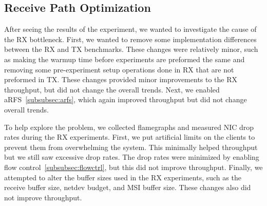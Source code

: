 \subsection{Receive Path Optimization}
\label{subsec:rx_opt}

After seeing the results of the experiment, we wanted to investigate the cause of the RX bottleneck. First, we wanted to remove some implementation differences between the RX and TX benchmarks. These changes were relatively minor, such as making the warmup time before experiments are preformed the same and removing some pre-experiment setup operations done in RX that are not preformed in TX. These changes provided minor improvements to the RX throughput, but did not change the overall trends. Next, we enabled aRFS~\ref{subsubsec:arfs}, which again improved throughput but did not change overall trends.

To help explore the problem, we collected flamegraphs and measured NIC drop rates during the RX experiments. First, we put artificial limits on the clients to prevent them from overwhelming the system. This minimally helped throughput but we still saw excessive drop rates. The drop rates were minimized by enabling flow control~\ref{subsubsec:flowctrl}, but this did not improve throughput. Finally, we attempted to alter the buffer sizes used in the RX experiments, such as the receive buffer size, netdev budget, and MSI buffer size. These changes also did not improve throughput.